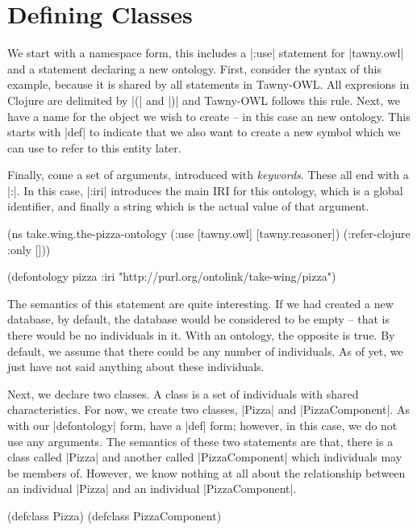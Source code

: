 \section{Defining Classes}
\label{sec:defining-classes}

We start with a namespace form, this includes a |:use| statement for
|tawny.owl| and a statement declaring a new ontology. First, consider the
syntax of this example, because it is shared by all statements in Tawny-OWL.
All expresions in Clojure are delimited by |(| and |)| and Tawny-OWL follows
this rule. Next, we have a name for the object we wish to create -- in this
case an new ontology. This starts with |def| to indicate that we also want to
create a new symbol which we can use to refer to this entity later.

Finally, come a set of arguments, introduced with \emph{keywords}. These all
end with a |:|. In this case, |:iri| introduces the main IRI for this
ontology, which is a global identifier, and finally a string which is
the actual value of that argument.

\begin{tawny}
(ns take.wing.the-pizza-ontology
  (:use [tawny.owl]
        [tawny.reasoner])
  (:refer-clojure :only []))

(defontology pizza :iri "http://purl.org/ontolink/take-wing/pizza")
\end{tawny}


The semantics of this statement are quite interesting. If we had created
a new database, by default, the database would be considered to be empty
-- that is there would be no individuals in it. With an ontology, the
opposite is true. By default, we assume that there could be any number
of individuals. As of yet, we just have not said anything about these
individuals.

Next, we declare two classes. A class is a set of individuals with
shared characteristics. For now, we create two classes, |Pizza| and
|PizzaComponent|. As with our |defontology| form, have a |def| form;
however, in this case, we do not use any arguments. The semantics of
these two statements are that, there is a class called |Pizza| and
another called |PizzaComponent| which individuals may be members of.
However, we know nothing at all about the relationship between an
individual |Pizza| and an individual |PizzaComponent|.


\begin{tawny}
(defclass Pizza)
(defclass PizzaComponent)
\end{tawny}

